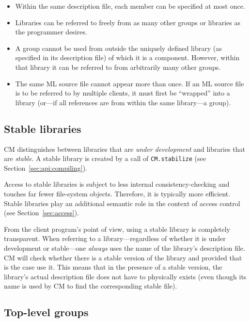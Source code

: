 \documentclass[titlepage,letterpaper]{article}
\begin{document}
\begin{itemize}
\item Within the same description file, each member can be specified
at most once.
\item Libraries can be referred to freely from as many other groups or
libraries as the programmer desires.
\item A group cannot be used from outside the uniquely defined library
(as specified in its description file) of which it is a component.
However, within that library it can be referred to from arbitrarily
many other groups.
\item The same ML source file cannot appear more than once.  If an ML
source file is to be referred to by multiple clients, it must first be
``wrapped'' into a library (or---if all references are from within the
same library---a group).
\end{itemize}

\subsection{Stable libraries}
\label{sec:stable}

CM distinguishes between libraries that are {\em under development}
and libraries that are {\em stable}.  A stable library is created by a
call of {\tt CM.stabilize} (see Section~\ref{sec:api:compiling}).

Access to stable libraries is subject to less internal
consistency-checking and touches far fewer file-system
objects. Therefore, it is typically more efficient.  Stable libraries
play an additional semantic role in the context of access control (see
Section~\ref{sec:access}).

From the client program's point of view, using a stable library is
completely transparent.  When referring to a library---regardless of
whether it is under development or stable---one {\em always} uses the
name of the library's description file.  CM will check whether there
is a stable version of the library and provided that is the case use
it.  This means that in the presence of a stable version, the
library's actual description file does not have to physically exists
(even though its name is used by CM to find the corresponding stable
file).

\subsection{Top-level groups}
\end{document}
